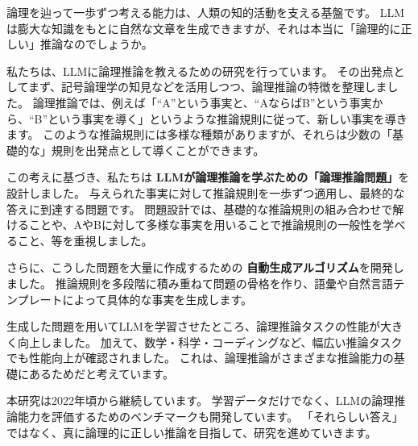 論理を辿って一歩ずつ考える能力は、人類の知的活動を支える基盤です。
LLMは膨大な知識をもとに自然な文章を生成できますが、それは本当に「論理的に正しい」推論なのでしょうか。

私たちは、LLMに論理推論を教えるための研究を行っています。
その出発点としてまず、記号論理学の知見などを活用しつつ、論理推論の特徴を整理しました。
論理推論では、例えば「``A''という事実と、``AならばB''という事実から、``B''という事実を導く」というような推論規則に従って、新しい事実を導きます。
このような推論規則には多様な種類がありますが、それらは少数の「基礎的な」規則を出発点として導くことができます。

この考えに基づき、私たちは \textbf{LLMが論理推論を学ぶための「論理推論問題」}を設計しました。
与えられた事実に対して推論規則を一歩ずつ適用し、最終的な答えに到達する問題です。
問題設計では、基礎的な推論規則の組み合わせで解けることや、AやBに対して多様な事実を用いることで推論規則の一般性を学べること、等を重視しました。

さらに、こうした問題を大量に作成するための \textbf{自動生成アルゴリズム}を開発しました。
推論規則を多段階に積み重ねて問題の骨格を作り、語彙や自然言語テンプレートによって具体的な事実を生成します。

生成した問題を用いてLLMを学習させたところ、論理推論タスクの性能が大きく向上しました。
加えて、数学・科学・コーディングなど、幅広い推論タスクでも性能向上が確認されました。
これは、論理推論がさまざまな推論能力の基礎にあるためだと考えています。

本研究は2022年頃から継続しています。
学習データだけでなく、LLMの論理推論能力を評価するためのベンチマークも開発しています。
「それらしい答え」ではなく、真に論理的に正しい推論を目指して、研究を進めていきます。

